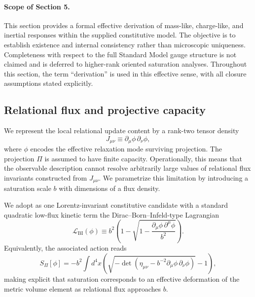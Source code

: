 \documentclass[pdflatex,sn-mathphys-num]{sn-jnl} %
\theoremstyle{remark}
\begin{document}
    \paragraph{Scope of Section 5.}
      This section provides a formal effective derivation of mass-like, charge-like, and inertial
      responses within the supplied constitutive model.
      The objective is to establish existence and internal consistency rather than microscopic
      uniqueness.
      Completeness with respect to the full Standard Model gauge structure is not claimed and is
      deferred to higher-rank oriented saturation analyses.
      Throughout this section, the term ``derivation'' is used in this effective sense, with all
      closure assumptions stated explicitly.

  \subsection{Relational flux and projective capacity}
  \label{subsec:relational_flux}

  We represent the local relational update content by a rank-two tensor density
  \begin{equation}
    J_{\mu\nu} \equiv \partial_{\mu}\phi \, \partial_{\nu}\phi,
    \label{eq:relational_tensor}
  \end{equation}
  where $\phi$ encodes the effective relaxation mode surviving projection.
  The projection $\Pi$ is assumed to have finite capacity.
  Operationally, this means that the observable description cannot resolve arbitrarily large
  values of relational flux invariants constructed from $J_{\mu\nu}$.
  We parametrize this limitation by introducing a saturation scale $b$ with dimensions of a
  flux density.

  We adopt as one Lorentz-invariant constitutive candidate with a standard quadratic low-flux
  kinetic term the Dirac--Born--Infeld-type Lagrangian
  \begin{equation}
    \mathcal{L}_{\mathrm{BI}}(\phi)
    \equiv b^2\left(1-\sqrt{1-\frac{\partial_{\mu}\phi \,
    \partial^{\mu}\phi}{b^2}}\right).
    \label{eq:lagrangian_dbi_scalar}
  \end{equation}
  Equivalently, the associated action reads
  \begin{equation}
    S_{\Pi}[\phi]
    = -b^2 \int d^4x
    \left(
      \sqrt{-\det\left(
                   \eta_{\mu\nu}-b^{-2}\partial_{\mu}\phi \,
                   \partial_{\nu}\phi
      \right)} - 1
    \right),
    \label{eq:action_bi}
  \end{equation}
  making explicit that saturation corresponds to an effective deformation of the metric
  volume element as relational flux approaches $b$.
\end{document}
